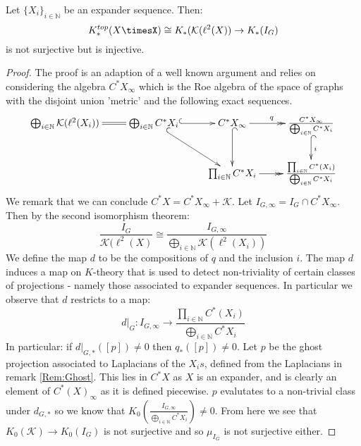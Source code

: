 \begin{proposition}\label{Prop:Ghost}
Let $\lbrace X_{i} \rbrace_{i\in \mathbb{N}}$ be an expander sequence. Then:
\begin{equation*}
K_{*}^{top}(X\timesX)\cong K_{*}(\mathcal{K}(\ell^{2}(X)) \rightarrow K_{*}(I_{G})
\end{equation*}
is not surjective but is injective.
\end{proposition}
\begin{proof}
The proof is an adaption of a well known argument and relies on considering the algebra $C^{*}X_{\infty}$ which is the Roe algebra of the space of graphs with the disjoint union 'metric' and the following exact sequences.
\begin{equation*}
\xymatrix{\bigoplus_{i\in\mathbb{N}}\mathcal{K}(\ell^{2}(X_{i}))\ar@{=}[r] &\bigoplus_{i\in \mathbb{N}}C^{*}X_{i} \ar@{^{(}->}[r]\ar@{^{(}->}[dr] & C^{*}X_{\infty} \ar@{->>}[r]^{q} \ar@{^{(}->}[d] & \frac{C^{*}X_{\infty}}{\bigoplus_{i\in\mathbb{N}}C^{*}X_{i}}\ar@{^{(}->}[d]^{i}\\
& & \prod_{i\in \mathbb{N}}C^{*}X_{i} \ar@{->>}[r]& \frac{\prod_{i\in\mathbb{N}} C^{*}(X_{i})}{\bigoplus_{i\in\mathbb{N}}C^{*}X_{i}}
}
\end{equation*}
We remark that we can conclude $C^{*}X = C^{*}X_{\infty}+\mathcal{K}$. Let $I_{G,\infty} = I_{G}\cap C^{*}X_{\infty}$. Then by the second isomorphism theorem:
\begin{equation*}
\frac{I_{G}}{\mathcal{K}(\ell^{2}(X)}\cong \frac{I_{G,\infty}}{\bigoplus_{i\in\mathbb{N}}\mathcal{K}(\ell^{2}(X_{i}))}
\end{equation*}
We define the map $d$ to be the compositions of $q$ and the inclusion $i$. The map $d$ induces a map on $K$-theory that is used to detect non-triviality of certain classes of projections - namely those associated to expander sequences. In particular we observe that $d$ restricts to a map:
\begin{equation*}
d|_{G}:I_{G,\infty} \rightarrow \frac{\prod_{i\in\mathbb{N}} C^{*}(X_{i})}{\bigoplus_{i\in\mathbb{N}}C^{*}X_{i}}
\end{equation*}
In particular: if $d|_{G,*}([p])\not=0$ then $q_{*}([p])\not=0$. Let $p$ be the ghost projection associated to Laplacians of the $X_{i}s$, defined from the Laplacians in remark \ref{Rem:Ghost}. This lies in $C^{*}X$ as $X$ is an expander, and is clearly an element of $C^{*}(X)_{\infty}$ as it is defined piecewise. $p$ evalutates to a non-trivial class under $d_{G,*}$ so we know that $K_{0}(\frac{I_{G,\infty}}{\bigoplus_{i\in\mathbb{N}}C^{*}X_{i}})\not= 0$. From here we see that $K_{0}(\mathcal{K}) \rightarrow K_{0}(I_{G})$ is not surjective and so $\mu_{I_{G}}$ is not surjective either.


\end{proof}
